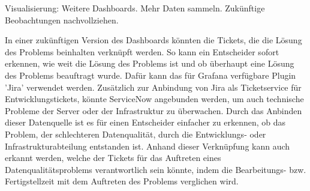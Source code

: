Visualisierung:
Weitere Dashboards. Mehr Daten sammeln. Zukünftige Beobachtungen nachvollziehen. 



In einer zukünftigen Version des Dashboards könnten die Tickets, die die Lösung des Problems beinhalten verknüpft werden. 
So kann ein Entscheider sofort erkennen, wie weit die Lösung des Problems ist und ob überhaupt eine Lösung des Problems beauftragt wurde. 
Dafür kann das für Grafana verfügbare Plugin 'Jira' verwendet werden. \cite{https://grafana.com/grafana/plugins/grafana-jira-datasource?pg=plugins&plcmt=featured-undefined}
Zusätzlich zur Anbindung von Jira als Ticketservice für Entwicklungstickets, könnte ServiceNow angebunden werden, um auch technische Probleme der Server oder der Infrastruktur zu überwachen. 
\cite{https://grafana.com/grafana/plugins/grafana-servicenow-datasource?pg=plugins&plcmt=featured-undefined}
Durch das Anbinden dieser Datenquelle ist es für einen Entscheider einfacher zu erkennen, ob das Problem, der schlechteren Datenqualität, durch die Entwicklungs- oder Infrastrukturabteilung entstanden ist. 
Anhand dieser Verknüpfung kann auch erkannt werden, welche der Tickets für das Auftreten eines Datenqualitätsproblems verantwortlich sein könnte, indem die Bearbeitungs- bzw. Fertigstellzeit mit dem Auftreten des Problems verglichen wird. 

